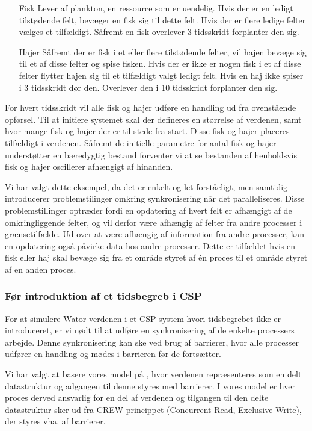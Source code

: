\begin{itemize}
\item[Fisk]
Lever af plankton, en ressource som er uendelig. Hvis der er en ledigt 
tilstødende felt, bevæger en fisk sig til dette felt. Hvis der er flere ledige 
felter vælges et tilfældigt. Såfremt en fisk overlever 3 tidsskridt forplanter 
den sig.
\item[Hajer]
Såfremt der er fisk i et eller flere tilstødende felter, vil hajen bevæge sig 
til et af disse felter og spise fisken. Hvis der er ikke er nogen fisk i et af 
disse felter flytter hajen sig til et tilfældigt valgt ledigt felt. Hvis en haj 
ikke spiser i 3 tidsskridt dør den. Overlever den i 10 tidsskridt forplanter 
den sig.
\end{itemize}

For hvert tidsskridt vil alle fisk og hajer udføre en handling ud fra
ovenstående opførsel.
Til at initiere systemet skal der defineres en størrelse af verdenen,
samt hvor mange fisk og hajer der er til stede fra start. Disse fisk og
hajer placeres tilfældigt i verdenen.
Såfremt de initielle parametre for antal fisk og hajer understøtter en 
bæredygtig bestand forventer vi at se bestanden af henholdsvis fisk og hajer 
oscillerer afhængigt af hinanden.

Vi har valgt dette eksempel, da det er enkelt og let forståeligt, men samtidig 
introducerer problemstilinger omkring synkronisering når det paralleliseres.  
Disse problemstillinger optræder fordi en opdatering af hvert felt er afhængigt 
af de omkringliggende felter, og vil derfor være afhængig af felter fra andre 
processer i grænsetilfælde. Ud over at være afhængig af information fra andre 
processer, kan en opdatering også påvirke data hos andre processer. Dette er 
tilfældet hvis en fisk eller haj skal bevæge sig fra et område styret af én 
proces til et område styret af en anden proces.  

\subsubsection*{Før introduktion af et tidsbegreb i CSP} For at simulere Wator 
verdenen i et CSP-system hvori tidsbegrebet ikke er introduceret, er vi nødt 
til at udføre en synkronisering af de enkelte processers arbejde. Denne 
synkronisering kan ske ved brug af barrierer, hvor alle processer udfører en 
handling og mødes i barrieren før de fortsætter.

Vi har valgt at basere vores model på \cite{crew}, hvor verdenen repræsenteres 
som en delt datastruktur og adgangen til denne styres med barrierer. I vores 
model er hver proces derved ansvarlig for en del af verdenen og tilgangen til 
den delte datastruktur sker ud fra CREW-princippet (Concurrent Read, Exclusive 
Write)\cite[5]{crew}, der styres vha. af barrierer. 

